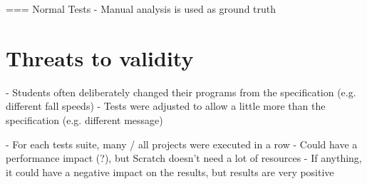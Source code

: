 === Normal Tests
- Manual analysis is used as ground truth

\section{Threats to validity}
- Students often deliberately changed their programs from the specification (e.g. different fall speeds)
    - Tests were adjusted to allow a little more than the specification (e.g. different message)

- For each tests suite, many / all projects were executed in a row
    - Could have a performance impact (?), but Scratch doesn't need a lot of resources
    - If anything, it could have a negative impact on the results, but results are very positive

